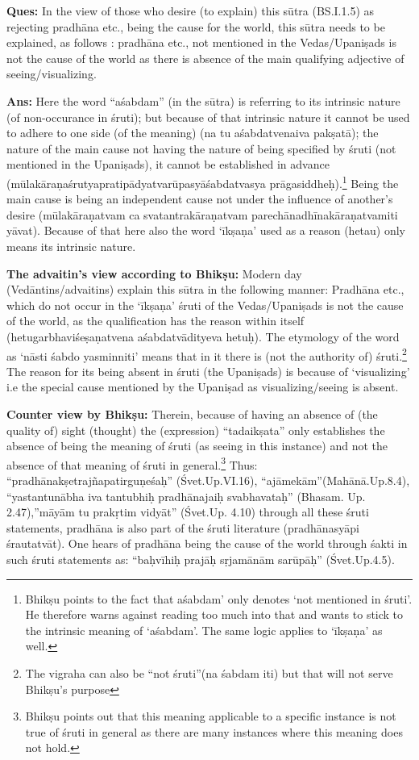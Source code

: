 \textbf{Ques:} In the view of those who desire (to explain) this sūtra (BS.I.1.5) as rejecting pradhāna etc., being the cause for the world, this sūtra needs to be explained, as follows : pradhāna etc., not mentioned in the Vedas/Upaniṣads is not the cause of the world as there is absence of the main qualifying adjective of seeing/visualizing. 

\textbf{Ans:} Here the word “aśabdam” (in the sūtra) is referring to its intrinsic nature (of non-occurance in śruti); but because of  that intrinsic nature it cannot be used to adhere to one side (of the meaning) (na tu aśabdatvenaiva pakṣatā); the nature of the main cause not having the nature of being specified by śruti (not mentioned in the Upaniṣads), it cannot be established in advance (mūlakāraṇaśrutyapratipādyatvarūpasyāśabdatvasya prāgasiddheḥ).\footnote{Bhikṣu points to the fact that aśabdam’ only denotes ‘not mentioned in śruti’. He therefore warns against reading too much into that and wants to stick to the intrinsic meaning of ‘aśabdam’. The same logic applies to ‘īkṣaṇa’ as well.} Being the main cause is being an independent cause not under the influence of another’s desire (mūlakā\-raṇatvam ca svatantrakāraṇatvam parechānadhīnakāraṇatvamiti yāvat). Because of that here also the word ‘īkṣaṇa’ used as a reason (hetau) only means its intrinsic nature. 

\textbf{The advaitin’s view according to Bhikṣu:} Modern day (Vedāntins/\-advaitins) explain this sūtra in the following manner: Pradhāna etc., which do not occur in the ‘īkṣaṇa’ śruti of the Vedas/Upaniṣads is not the cause of the world, as the qualification has the reason within itself (hetugarbhaviśeṣaṇatvena  aśabdatvādityeva hetuḥ).  The etymology of the word as ‘nāsti śabdo yasminniti’ means that in it there is (not the authority of) śruti.\footnote{The vigraha can also be “not śruti”(na śabdam iti) but that will not serve Bhikṣu’s purpose} The reason for its being absent in śruti (the Upaniṣads) is because of ‘visualizing’ i.e the special cause mentioned by the Upaniṣad as visualizing/seeing is absent. 

\textbf{Counter view by Bhikṣu:} Therein, because of having an absence of (the quality of) sight (thought) the (expression) “tadaikṣata” only establishes the absence of being the meaning of śruti (as seeing in this instance) and not the absence of that meaning of śruti in general.\footnote{Bhikṣu points out that this meaning applicable to a specific instance is not true of śruti in general as there are many instances where this meaning does not hold.} Thus: “pradhānakṣetrajñapatirguṇeśaḥ” (Śvet.Up.VI.16), “ajāmekām”(Mahānā.Up.8.4), “yastantunābha iva tantubhiḥ pradhānajaiḥ svabhavataḥ” (Bhasam. Up. 2.47),”māyām tu prakṛtim vidyāt” (Śvet.Up. 4.10) through all these śruti statements, pradhāna is also part of the śruti literature (pradhānasyāpi śrautatvāt). One hears of pradhāna being the cause of the world through śakti in such śruti statements as: “baḥvīhiḥ prajāḥ sṛjamānām sarūpāḥ” (Śvet.Up.4.5).

